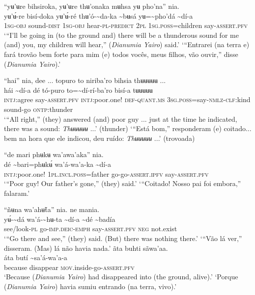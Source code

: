 \documentclass[output=paper,
modfonts,nonflat
]{langsci/langscibook}
\begin{document}
\ea “yʉ’ʉre bihsiroka, yʉ’ʉre thʉ'onaka mʉhsa yʉ pho'na” nia. \\[.3em]
\gll yʉ’ʉ́-re	bisí-doka	yʉ’ʉ́-ré	thʉ'ó-{\textasciitilde}da-ka	{\textasciitilde}bʉsá	yʉ={\textasciitilde}pho'dá	{\textasciitilde}dí-a \\
     1\textsc{sg-obj}	sound-\textsc{dist}	1\textsc{sg-obj}	hear\textsc{-pl-predict}	2\textsc{pl}	1\textsc{sg.poss}=children	say-\textsc{assert.pfv}\\
\glt ‘“I'll be going in (to the ground and) there will be a thunderous sound for me (and) you, my children will hear,” (\textit{Dianumia Yairo}) said.’
\glt ‘“Entrarei (na terra e) fará trovão bem forte para mim (e) todos vocês, meus filhos, vão ouvir,” disse (\textit{Dianumia Yairo}).’
\z 

\ea “hai” nia, dee ... topuro to niriba'ro bihsia thʉʉʉʉʉ ... \\[.3em]
\gll hái	{\textasciitilde}dí-a	dé	tó-puro	to={\textasciitilde}dí-rí-ba'ro	bisí-a	tʉʉʉʉʉ \\
     \textsc{intj:}agree	say-\textsc{assert.pfv}	\textsc{intj:}poor.one!	\textsc{def-quant.ms}	3\textsc{sg.poss}=say\textsc{-nmlz}-\textsc{clf:}kind	sound-go	\textsc{ontp:}thunder\\
\glt ‘“All right,” (they) answered (and) poor guy ... just at the time he indicated, there was a sound: \textit{Thʉʉʉʉʉ} ...' (thunder)
\glt ‘“Está bom,” responderam (e) coitado... bem na hora que ele indicou, deu ruído: \textit{Thʉʉʉʉʉ} ...' (trovoada)
\z 

\ea “de mari phʉkʉ wa'awa'aka” nia.  \\[.3em]
\gll dé	{\textasciitilde}bari=phʉkʉ́	wa'á-wa'a-ka	{\textasciitilde}dí-a \\
     \textsc{intj:}poor.one!	1\textsc{pl.incl.poss}=father	go-go-\textsc{assert.ipfv}	say-\textsc{assert.pfv}\\
\glt ‘“Poor guy! Our father's gone,” (they) said.’ 
\glt ‘“Coitado! Nosso pai foi embora,” falaram.’
\z

\newpage 
\ea “ñʉna wa'ahʉ̃ta” nia. ne mania.\\[.3em]
\gll {\textasciitilde}yʉ́-{\textasciitilde}dá	wa'á-{\textasciitilde}hʉ-ta	{\textasciitilde}dí-a	{\textasciitilde}dé	{\textasciitilde}badía \\
     see/look\textsc{-pl}	go-\textsc{imp.deic-emph}	say-\textsc{assert.pfv}	\textsc{neg}	not.exist\\
\glt ‘“Go there and see,” (they) said. (But) there was nothing there.’
\glt ‘“Vão lá ver,” disseram. (Mas) lá não havia nada.’
\z 
\ea ãta buhti sãwa'aa. \\[.3em]
\gll {\textasciitilde}áta	butí	{\textasciitilde}sa'á-wa'a-a \\
     because	disappear	\textsc{mov.}inside-go-\textsc{assert.pfv}\\
\glt ‘Because (\textit{Dianumia Yairo}) had disappeared into (the ground, alive).’ 
\glt ‘Porque (\textit{Dianumia Yairo}) havia sumiu entrando (na terra, vivo).’
\z 
\end{document}
